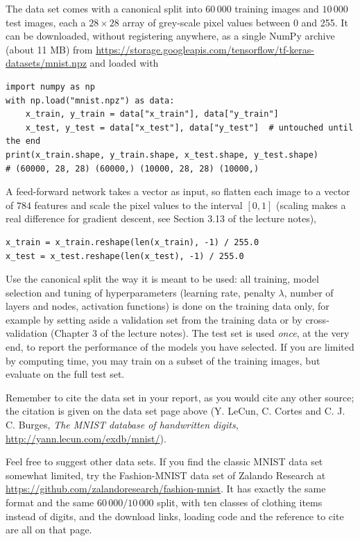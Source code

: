 \documentclass[11pt,a4paper]{article}
\begin{document}
The data set comes with a canonical split into $60\,000$ training images
and $10\,000$ test images, each a $28\times 28$ array of grey-scale pixel
values between 0 and 255.  It can be downloaded, without registering
anywhere, as a single NumPy archive (about 11 MB) from
\url{https://storage.googleapis.com/tensorflow/tf-keras-datasets/mnist.npz}
and loaded with
\begin{lstlisting}
import numpy as np
with np.load("mnist.npz") as data:
    x_train, y_train = data["x_train"], data["y_train"]
    x_test, y_test = data["x_test"], data["y_test"]  # untouched until the end
print(x_train.shape, y_train.shape, x_test.shape, y_test.shape)
# (60000, 28, 28) (60000,) (10000, 28, 28) (10000,)
\end{lstlisting}
A feed-forward network takes a vector as input, so flatten each image to a
vector of $784$ features and scale the pixel values to the interval $[0,1]$
(scaling makes a real difference for gradient descent, see Section 3.13 of
the lecture notes),
\begin{lstlisting}
x_train = x_train.reshape(len(x_train), -1) / 255.0
x_test = x_test.reshape(len(x_test), -1) / 255.0
\end{lstlisting}
Use the canonical split the way it is meant to be used: all training, model
selection and tuning of hyperparameters (learning rate, penalty $\lambda$,
number of layers and nodes, activation functions) is done on the training
data only, for example by setting aside a validation set from the training
data or by cross-validation (Chapter 3 of the lecture notes).  The test set
is used \emph{once}, at the very end, to report the performance of the
models you have selected.  If you are limited by computing time, you may
train on a subset of the training images, but evaluate on the full test
set.

Remember to cite the data set in your report, as you would cite any other
source; the citation is given on the data set page above (Y. LeCun,
C. Cortes and C. J. C. Burges, \emph{The MNIST database of handwritten
digits}, \url{http://yann.lecun.com/exdb/mnist/}).

Feel free to suggest other data sets.  If you find the classic MNIST data
set somewhat limited, try the Fashion-MNIST data set of Zalando Research at
\url{https://github.com/zalandoresearch/fashion-mnist}.  It has exactly the
same format and the same $60\,000/10\,000$ split, with ten classes of
clothing items instead of digits, and the download links, loading code and
the reference to cite are all on that page.
\end{document}
